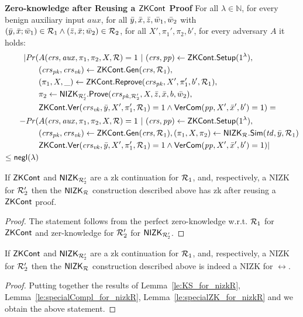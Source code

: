 \noindent \textbf{Zero-knowledge after Reusing a ${\mathsf{ZKCont}}$ Proof} For all $\lambda \in \mathbb{N}$, for every benign auxiliary input $aux$, 
for all $\bar{y},\bar{x},\bar{z}, \bar{w}_1, \bar{w}_2$ with $(\bar{y}, \bar{x}; \bar{w}_1) \in \mathcal{R}_1 \wedge (\bar{z}, \bar{x}; \bar{w}_2) \in \mathcal{R}_2$, for all $X',\pi_1',\pi_2, b'$, for every adversary $A$ it holds:
\begin{align*}
| \mathit{Pr}(& A(\crs, \realaux, \pi_1,\pi_2, X, \rel) = 1 \ | \ (\crs, \pp) \leftarrow \ZKCont.\Setup (1^{\lambda}), \\
                  & (\crspk, \crsvk) \leftarrow \ZKCont.\Gen(\crs, \relone), \\
                  &(\pi_1, X, \_) \leftarrow \ZKCont.\Reprove (\crspk, X', \pi_1', b', \relone), \\
                  & \pi_2 \leftarrow \nizktwo.\Prove(\crspktwo, X, \barz, \barx, b, \baromega_2), \\
                  &  \ZKCont.\Verify(\crsvk, \bary, X', \pi'_1, \relone) = 1 
                  \wedge \VerifyCom(\pp, X', \barx', b') = 1) =  \\
- \mathit{Pr}(& A(\crs, \realaux, \pi_1,\pi_2, X, \rel) = 1 \ | \ (\crs, \pp) \leftarrow \ZKCont.\Setup (1^{\lambda}), \\ 
                     & (\crspk, \crsvk) \leftarrow \ZKCont.\Gen(\crs, \relone), (\pi_1, X,\pi_2) \leftarrow \nizkR.\Sim(\tw, \bary, \relone) \\ 
                     &  \ZKCont.\Verify(\crsvk, \bary, X', \pi'_1, \relone) = 1
                    \wedge \VerifyCom(\pp, X', \barx', b') = 1) | \\
                    \leq \negl(\lambda)
\end{align*}


\begin{lemma} 
\label{le:specialZK_for_nizkR}
If ${\mathsf{ZKCont}}$ and ${\mathsf{NIZK_{\mathcal{R}'_2}}}$ are a zk continuation for $\mathcal{R}_1$, and, respectively, a NIZK 
for $\mathcal{R}_2'$ then the ${\mathsf{NIZK_{\mathcal{R}}}}$ construction described above has zk after reusing a ${\mathsf{ZKCont}}$ proof.
\end{lemma} 
\begin{proof} The statement follows from the perfect zero-knowledge w.r.t. $\mathcal{R}_1$ for ${\mathsf{ZKCont}}$ and zer-knowledge for $\mathcal{R}_2'$ for ${\mathsf{NIZK_{\mathcal{R}'_2}}}$.
\end{proof}
 
\begin{corollary}If ${\mathsf{ZKCont}}$ and ${\mathsf{NIZK_{\mathcal{R}'_2}}}$ are a zk continuation for $\mathcal{R}_1$, and, respectively, a NIZK 
for $\mathcal{R}_2'$ then the ${\mathsf{NIZK_{\mathcal{R}}}}$ construction described above is indeed a NIZK for $\rel$.
 \end{corollary}
 
\begin{proof} Putting together the results of Lemma~\ref{le:KS_for_nizkR}, Lemma~\ref{le:specialCompl_for_nizkR}, 
Lemma~\ref{le:specialZK_for_nizkR} and  we obtain the above statement.
\end{proof} 
